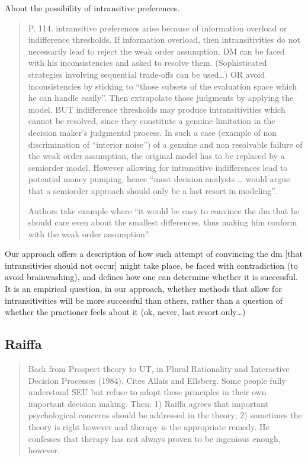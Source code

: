 \documentclass[preprint, french, english, 11pt, authoryear]{elsarticle}%
\begin{document}
About the possibility of intransitive preferences.
\begin{quote}
P. 114. intransitive preferences arise because of information overload or indifference thresholds. If information overload, then intransitivities do not necessarily lead to reject the weak order assumption. DM can be faced with his inconsistencies and asked to resolve them. (Sophisticated strategies involving sequential trade-offs can be used…) OR avoid inconsistencies by sticking to “those subsets of the evaluation space which he can handle easily”. Then extrapolate those judgments by applying the model. BUT indifference thresholds may produce intransitivities which cannot be resolved, since they constitute a genuine limitation in the decision maker’s judgmental process. In such a case (example of non discrimination of “interior noise”) of a genuine and non resolvable failure of the weak order assumption, the original model has to be replaced by a semiorder model. However allowing for intransitive indifferences lead to potential money pumping, hence “most decision analysts … would argue that a semiorder approach should only be a last resort in modeling”.

Authors take example where “it would be easy to convince the dm that he should care even about the smallest differences, thus making him conform with the weak order assumption”.
\end{quote}

Our approach offers a description of how such attempt of convincing the dm [that intransitivies should not occur] might take place, be faced with contradiction (to avoid brainwashing), and defines how one can determine whether it is successful. It is an empirical question, in our approach, whether methods that allow for intransitivities will be more successful than others, rather than a question of whether the practioner feels about it (ok, never, last resort only…)

\subsection{Raiffa}
\begin{quote}
Back from Prospect theory to UT, in Plural Rationality and Interactive Decision Processes (1984). Cites Allais and Ellsberg. Some people fully understand SEU but refuse to adopt these principles in their own important decision making. Then: 1) Raiffa agrees that important psychological concerns should be addressed in the theory; 2) sometimes the theory is right however and therapy is the appropriate remedy. He confesses that therapy has not always proven to be ingenious enough, however.
\end{quote}
\end{document}

